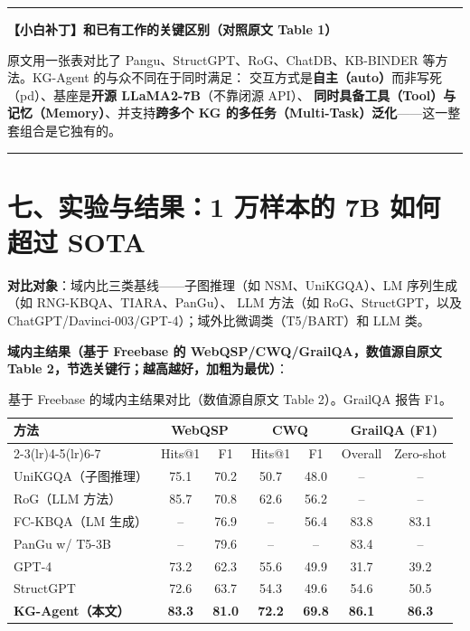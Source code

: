 \documentclass[11pt,UTF8,fontset=fandol]{ctexart}
\newenvironment{tip}[1]{%
  \par\smallskip\noindent\rule{\linewidth}{0.4pt}\par\nobreak
  \noindent\textbf{【小白补丁】#1}\par\nobreak\noindent\ignorespaces
}{%
  \par\noindent\rule{\linewidth}{0.4pt}\par\smallskip
}
\begin{document}
\begin{tip}{和已有工作的关键区别（对照原文 Table 1）}
原文用一张表对比了 Pangu、StructGPT、RoG、ChatDB、KB-BINDER 等方法。KG-Agent 的与众不同在于同时满足：
交互方式是\textbf{自主（auto）}而非写死（pd）、基座是\textbf{开源 LLaMA2-7B}（不靠闭源 API）、
\textbf{同时具备工具（Tool）与记忆（Memory）}、并支持\textbf{跨多个 KG 的多任务（Multi-Task）泛化}——这一整套组合是它独有的。
\end{tip}

\section{七、实验与结果：1 万样本的 7B 如何超过 SOTA}

\textbf{对比对象}：域内比三类基线——子图推理（如 NSM、UniKGQA）、LM 序列生成（如 RNG-KBQA、TIARA、PanGu）、
LLM 方法（如 RoG、StructGPT，以及 ChatGPT/Davinci-003/GPT-4）；域外比微调类（T5/BART）和 LLM 类。

\textbf{域内主结果（基于 Freebase 的 WebQSP/CWQ/GrailQA，数值源自原文 Table 2，节选关键行；越高越好，加粗为最优）}：

\begin{table}[H]\centering
\caption{基于 Freebase 的域内主结果对比（数值源自原文 Table 2）。GrailQA 报告 F1。}
\begin{tabular}{lcccccc}
\toprule
\multirow{2}{*}{\textbf{方法}} & \multicolumn{2}{c}{\textbf{WebQSP}} & \multicolumn{2}{c}{\textbf{CWQ}} & \multicolumn{2}{c}{\textbf{GrailQA (F1)}} \\
\cmidrule(lr){2-3}\cmidrule(lr){4-5}\cmidrule(lr){6-7}
 & Hits@1 & F1 & Hits@1 & F1 & Overall & Zero-shot \\
\midrule
UniKGQA（子图推理）   & 75.1 & 70.2 & 50.7 & 48.0 & --   & --   \\
RoG（LLM 方法）       & 85.7 & 70.8 & 62.6 & 56.2 & --   & --   \\
FC-KBQA（LM 生成）    & --   & 76.9 & --   & 56.4 & 83.8 & 83.1 \\
PanGu w/ T5-3B        & --   & 79.6 & --   & --   & 83.4 & --   \\
GPT-4                 & 73.2 & 62.3 & 55.6 & 49.9 & 31.7 & 39.2 \\
StructGPT             & 72.6 & 63.7 & 54.3 & 49.6 & 54.6 & 50.5 \\
\textbf{KG-Agent（本文）} & \textbf{83.3} & \textbf{81.0} & \textbf{72.2} & \textbf{69.8} & \textbf{86.1} & \textbf{86.3} \\
\bottomrule
\end{tabular}
\end{table}
\end{document}
